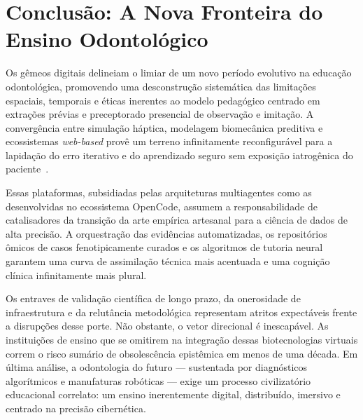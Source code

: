 \section{Conclusão: A Nova Fronteira do Ensino Odontológico}
\label{sec:educacao-conclusao}

Os gêmeos digitais delineiam o limiar de um novo período evolutivo na educação odontológica, promovendo uma desconstrução sistemática das limitações espaciais, temporais e éticas inerentes ao modelo pedagógico centrado em extrações prévias e preceptorado presencial de observação e imitação. A convergência entre simulação háptica, modelagem biomecânica preditiva e ecossistemas \textit{web-based} provê um terreno infinitamente reconfigurável para a lapidação do erro iterativo e do aprendizado seguro sem exposição iatrogênica do paciente~\cite{techsoc2025precision}.

Essas plataformas, subsidiadas pelas arquiteturas multiagentes como as desenvolvidas no ecossistema OpenCode, assumem a responsabilidade de catalisadores da transição da arte empírica artesanal para a ciência de dados de alta precisão. A orquestração das evidências automatizadas, os repositórios ômicos de casos fenotipicamente curados e os algoritmos de tutoria neural garantem uma curva de assimilação técnica mais acentuada e uma cognição clínica infinitamente mais plural.

Os entraves de validação científica de longo prazo, da onerosidade de infraestrutura e da relutância metodológica representam atritos expectáveis frente a disrupções desse porte. Não obstante, o vetor direcional é inescapável. As instituições de ensino que se omitirem na integração dessas biotecnologias virtuais correm o risco sumário de obsolescência epistêmica em menos de uma década. Em última análise, a odontologia do futuro — sustentada por diagnósticos algorítmicos e manufaturas robóticas — exige um processo civilizatório educacional correlato: um ensino inerentemente digital, distribuído, imersivo e centrado na precisão cibernética.
